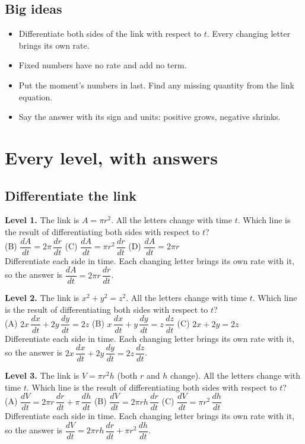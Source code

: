\documentclass[11pt]{article}
\begin{document}
\subsection*{Big ideas}\begin{itemize}\item Differentiate both sides of the link with respect to $t$. Every changing letter brings its own rate.
\item Fixed numbers have no rate and add no term.
\item Put the moment's numbers in last. Find any missing quantity from the link equation.
\item Say the answer with its sign and units: positive grows, negative shrinks.\end{itemize}
\section*{Every level, with answers}
\subsection*{Differentiate the link}
\noindent\textbf{Level 1.} The link is $A=\pi r^2$. All the letters change with time $t$. Which line is the result of differentiating both sides with respect to $t$?\\  \quad (B) $\dfrac{dA}{dt}=2\pi\,\dfrac{dr}{dt}$ \quad (C) $\dfrac{dA}{dt}=\pi r^2\,\dfrac{dr}{dt}$ \quad (D) $\dfrac{dA}{dt}=2\pi r$\\  \quad Differentiate each side in time. Each changing letter brings its own rate with it, so the answer is $\dfrac{dA}{dt}=2\pi r\,\dfrac{dr}{dt}$.\par\medskip
\noindent\textbf{Level 2.} The link is $x^2+y^2=z^2$. All the letters change with time $t$. Which line is the result of differentiating both sides with respect to $t$?\\ (A) $2x\,\dfrac{dx}{dt}+2y\,\dfrac{dy}{dt}=2z$ \quad (B) $x\,\dfrac{dx}{dt}+y\,\dfrac{dy}{dt}=z\,\dfrac{dz}{dt}$ \quad (C) $2x+2y=2z$ \quad {}\\  \quad Differentiate each side in time. Each changing letter brings its own rate with it, so the answer is $2x\,\dfrac{dx}{dt}+2y\,\dfrac{dy}{dt}=2z\,\dfrac{dz}{dt}$.\par\medskip
\noindent\textbf{Level 3.} The link is $V=\pi r^2h$ (both $r$ and $h$ change). All the letters change with time $t$. Which line is the result of differentiating both sides with respect to $t$?\\ (A) $\dfrac{dV}{dt}=2\pi r\,\dfrac{dr}{dt}+\pi\,\dfrac{dh}{dt}$ \quad (B) $\dfrac{dV}{dt}=2\pi rh\,\dfrac{dr}{dt}$ \quad (C) $\dfrac{dV}{dt}=\pi r^2\,\dfrac{dh}{dt}$ \quad {}\\  \quad Differentiate each side in time. Each changing letter brings its own rate with it, so the answer is $\dfrac{dV}{dt}=2\pi rh\,\dfrac{dr}{dt}+\pi r^2\,\dfrac{dh}{dt}$.\par\medskip
\end{document}
